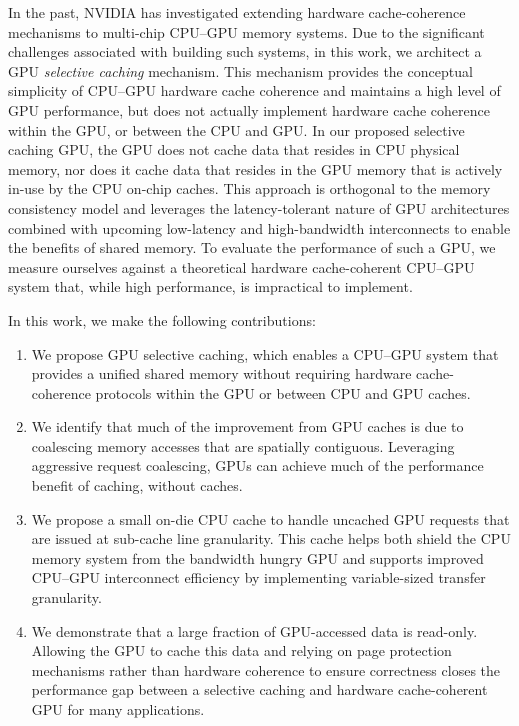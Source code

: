 In the past, NVIDIA has investigated extending hardware cache-coherence 
mechanisms to multi-chip CPU--GPU memory systems. Due to the significant challenges
associated with building such systems, in this work, we architect a GPU \textit{selective caching} 
mechanism. This mechanism provides the conceptual simplicity of CPU--GPU hardware cache coherence and
maintains a high level of GPU performance, but does not actually implement
hardware cache coherence within the GPU, or between the CPU and GPU. In our proposed 
selective caching GPU, the GPU does not cache data that resides in CPU physical 
memory, nor does it cache data that resides in the GPU memory that is 
actively in-use by the CPU on-chip caches. This approach is orthogonal to the memory
consistency model and leverages the latency-tolerant nature of GPU architectures combined with upcoming low-latency and 
high-bandwidth interconnects to enable the benefits of shared memory.  To evaluate the performance
of such a GPU, we measure ourselves against a theoretical hardware
cache-coherent CPU--GPU system that, 
while high performance, is impractical to implement.

In this work, we make the following contributions:

\begin{enumerate}
\item
We propose GPU selective caching, which enables a CPU--GPU system that provides a 
unified shared memory without requiring hardware cache-coherence protocols within the GPU
or between CPU and GPU caches.
\item
We identify that much of the improvement from GPU caches is due to coalescing 
memory accesses that are spatially contiguous.  Leveraging
aggressive request coalescing, GPUs can achieve much of the performance benefit
of caching, without caches.
\item
We propose a small on-die CPU cache to handle uncached GPU requests
that are issued at sub-cache line granularity. This cache helps both 
shield the CPU memory system from the bandwidth hungry GPU and supports
improved CPU--GPU interconnect efficiency by implementing variable-sized transfer granularity.
\item
We demonstrate that a large fraction of GPU-accessed data is read-only. Allowing 
the GPU to cache this data and relying on page protection mechanisms rather than hardware 
coherence to ensure correctness closes the performance gap between a selective
caching and hardware cache-coherent GPU for many applications.
\end{enumerate}
